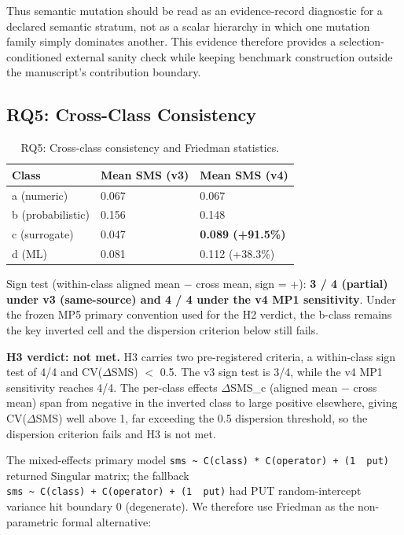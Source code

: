 \documentclass[manuscript,screen,review]{acmart}
\begin{document}
Thus semantic mutation should be read as an evidence-record diagnostic
for a declared semantic stratum, not as a scalar hierarchy in which one
mutation family simply dominates another. This evidence therefore
provides a selection-conditioned external sanity check while keeping
benchmark construction outside the manuscript's contribution boundary.

\subsection{RQ5: Cross-Class Consistency}\label{rq3-cross-class-consistency-and-friedman}

{%
\begin{longtable}[]{@{}lll@{}}
\caption{RQ5: Cross-class consistency and Friedman statistics.}\label{tab:p2-12}\\
\toprule\noalign{}
Class & Mean SMS (v3) & Mean SMS (v4) \\
\midrule\noalign{}
\endfirsthead
\endhead
\bottomrule\noalign{}
\endlastfoot
a (numeric) & 0.067 & 0.067 \\
b (probabilistic) & 0.156 & 0.148 \\
c (surrogate) & 0.047 & \textbf{0.089 (+91.5\%)} \\
d (ML) & 0.081 & 0.112 (+38.3\%) \\
\end{longtable}
}

Sign test (within-class aligned mean $-$ cross mean, sign = +): \textbf{3
/ 4 (partial) under v3 (same-source) and 4 / 4 under the v4 MP1
sensitivity}. Under the frozen MP5 primary convention used for the H2
verdict, the b-class remains the key inverted cell and the dispersion
criterion below still fails.

\textbf{H3 verdict: not met.} H3 carries two pre-registered criteria, a
within-class sign test of 4/4 and CV($\Delta$SMS) $<$ 0.5. The v3 sign
test is 3/4, while the v4 MP1 sensitivity reaches 4/4. The
per-class effects $\Delta$SMS\_c (aligned mean $-$ cross mean) span from
negative in the inverted class to large positive elsewhere, giving
CV($\Delta$SMS) well above 1, far exceeding the 0.5 dispersion threshold,
so the dispersion criterion fails and H3 is not met.

The mixed-effects primary model
\texttt{sms\ \textasciitilde{}\ C(class)\ *\ C(operator)\ +\ (1\ \textbar{}\ put)}
returned Singular matrix; the fallback
\texttt{sms\ \textasciitilde{}\ C(class)\ +\ C(operator)\ +\ (1\ \textbar{}\ put)}
had PUT random-intercept variance hit boundary 0 (degenerate). We
therefore use Friedman as the non-parametric formal alternative:
\end{document}
